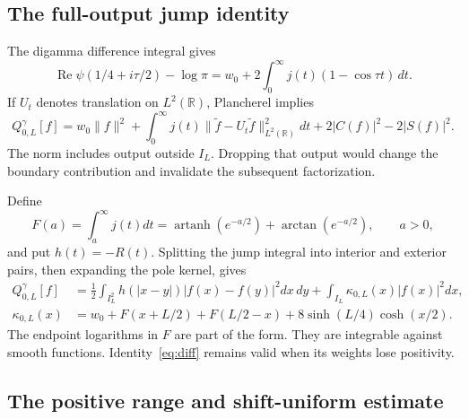 \documentclass[11pt]{article}
\numberwithin{equation}{section}
\theoremstyle{definition}
\theoremstyle{remark}
\newcommand{\R}{\mathbb R}
\newcommand{\norm}[1]{\lVert#1\rVert}
\newcommand{\Qgam}{Q^{\gamma}}
\DeclareMathOperator{\Rea}{Re}
\DeclareMathOperator{\artanh}{artanh}
\begin{document}
\subsection{The full-output jump identity}

The digamma difference integral \cite[\S5.9]{DLMF} gives
\begin{equation}
\Rea\psi(1/4+i\tau/2)-\log\pi
=w_0+2\int_0^\infty j(t)(1-\cos\tau t)\,dt.
\end{equation}
If $U_t$ denotes translation on $L^2(\R)$, Plancherel implies
\begin{equation}
\Qgam_{0,L}[f]=w_0\norm f^2
+\int_0^\infty j(t)\norm{\widetilde f-U_t\widetilde f}_{L^2(\R)}^2dt
+2|C(f)|^2-2|S(f)|^2.
\label{eq:jump}
\end{equation}
The norm includes output outside $I_L$. Dropping that output would change
the boundary contribution and invalidate the subsequent factorization.

Define
\begin{equation}
F(a)=\int_a^\infty j(t)dt
=\artanh(e^{-a/2})+\arctan(e^{-a/2}),\qquad a>0,
\end{equation}
and put $h(t)=-R(t)$. Splitting the jump integral into interior and exterior
pairs, then expanding the pole kernel, gives
\begin{align}
\Qgam_{0,L}[f]&=\frac12\int_{I_L^2}h(|x-y|)|f(x)-f(y)|^2dx\,dy
+\int_{I_L}\kappa_{0,L}(x)|f(x)|^2dx,\label{eq:diff}\\
\kappa_{0,L}(x)&=w_0+F(x+L/2)+F(L/2-x)
+8\sinh(L/4)\cosh(x/2).\label{eq:kappa}
\end{align}
The endpoint logarithms in $F$ are part of the form. They are integrable
against smooth functions. Identity~\eqref{eq:diff} remains valid when its
weights lose positivity.

\subsection{The positive range and shift-uniform estimate}
\end{document}
